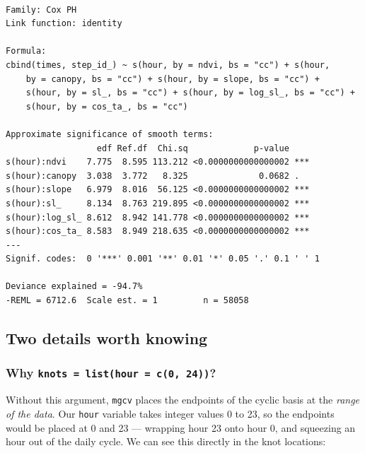 \documentclass[
  letterpaper,
  DIV=11,
  numbers=noendperiod]{scrartcl}
\newenvironment{Shaded}{\begin{snugshade}}{\end{snugshade}}
\newcommand{\AttributeTok}[1]{\textcolor[rgb]{0.40,0.45,0.13}{#1}}
\newcommand{\CommentTok}[1]{\textcolor[rgb]{0.37,0.37,0.37}{#1}}
\newcommand{\ConstantTok}[1]{\textcolor[rgb]{0.56,0.35,0.01}{#1}}
\newcommand{\DecValTok}[1]{\textcolor[rgb]{0.68,0.00,0.00}{#1}}
\newcommand{\FunctionTok}[1]{\textcolor[rgb]{0.28,0.35,0.67}{#1}}
\newcommand{\NormalTok}[1]{\textcolor[rgb]{0.00,0.23,0.31}{#1}}
\newcommand{\OtherTok}[1]{\textcolor[rgb]{0.00,0.23,0.31}{#1}}
\newcommand{\SpecialCharTok}[1]{\textcolor[rgb]{0.37,0.37,0.37}{#1}}
\newcommand{\StringTok}[1]{\textcolor[rgb]{0.13,0.47,0.30}{#1}}
\begin{document}
\begin{verbatim}

Family: Cox PH 
Link function: identity 

Formula:
cbind(times, step_id_) ~ s(hour, by = ndvi, bs = "cc") + s(hour, 
    by = canopy, bs = "cc") + s(hour, by = slope, bs = "cc") + 
    s(hour, by = sl_, bs = "cc") + s(hour, by = log_sl_, bs = "cc") + 
    s(hour, by = cos_ta_, bs = "cc")

Approximate significance of smooth terms:
                  edf Ref.df  Chi.sq             p-value    
s(hour):ndvi    7.775  8.595 113.212 <0.0000000000000002 ***
s(hour):canopy  3.038  3.772   8.325              0.0682 .  
s(hour):slope   6.979  8.016  56.125 <0.0000000000000002 ***
s(hour):sl_     8.134  8.763 219.895 <0.0000000000000002 ***
s(hour):log_sl_ 8.612  8.942 141.778 <0.0000000000000002 ***
s(hour):cos_ta_ 8.583  8.949 218.635 <0.0000000000000002 ***
---
Signif. codes:  0 '***' 0.001 '**' 0.01 '*' 0.05 '.' 0.1 ' ' 1

Deviance explained = -94.7%
-REML = 6712.6  Scale est. = 1         n = 58058
\end{verbatim}

\subsection{Two details worth knowing}\label{two-details-worth-knowing}

\subsubsection{\texorpdfstring{Why
\texttt{knots\ =\ list(hour\ =\ c(0,\ 24))}?}{Why knots = list(hour = c(0, 24))?}}\label{why-knots-listhour-c0-24}

Without this argument, \texttt{mgcv} places the endpoints of the cyclic
basis at the \emph{range of the data}. Our \texttt{hour} variable takes
integer values 0 to 23, so the endpoints would be placed at 0 and 23 ---
wrapping hour 23 onto hour 0, and squeezing an hour out of the daily
cycle. We can see this directly in the knot locations:

\begin{Shaded}
\end{Shaded}
\end{document}
